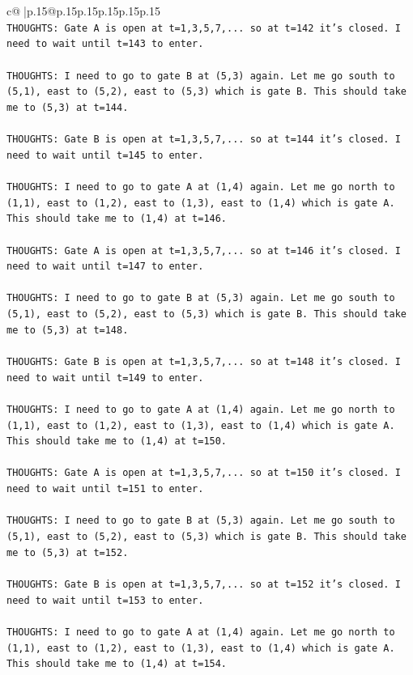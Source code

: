 \documentclass{article}
\begin{document}
{\begin{supertabular}{c@{$\;$}|p{.15\linewidth}@{}p{.15\linewidth}p{.15\linewidth}p{.15\linewidth}p{.15\linewidth}p{.15\linewidth}}
{{{\\ 
\texttt{THOUGHTS: Gate A is open at t=1,3,5,7,... so at t=142 it's closed. I need to wait until t=143 to enter.} \\
\\ 
\texttt{THOUGHTS: I need to go to gate B at (5,3) again. Let me go south to (5,1), east to (5,2), east to (5,3) which is gate B. This should take me to (5,3) at t=144.} \\
\\ 
\texttt{THOUGHTS: Gate B is open at t=1,3,5,7,... so at t=144 it's closed. I need to wait until t=145 to enter.} \\
\\ 
\texttt{THOUGHTS: I need to go to gate A at (1,4) again. Let me go north to (1,1), east to (1,2), east to (1,3), east to (1,4) which is gate A. This should take me to (1,4) at t=146.} \\
\\ 
\texttt{THOUGHTS: Gate A is open at t=1,3,5,7,... so at t=146 it's closed. I need to wait until t=147 to enter.} \\
\\ 
\texttt{THOUGHTS: I need to go to gate B at (5,3) again. Let me go south to (5,1), east to (5,2), east to (5,3) which is gate B. This should take me to (5,3) at t=148.} \\
\\ 
\texttt{THOUGHTS: Gate B is open at t=1,3,5,7,... so at t=148 it's closed. I need to wait until t=149 to enter.} \\
\\ 
\texttt{THOUGHTS: I need to go to gate A at (1,4) again. Let me go north to (1,1), east to (1,2), east to (1,3), east to (1,4) which is gate A. This should take me to (1,4) at t=150.} \\
\\ 
\texttt{THOUGHTS: Gate A is open at t=1,3,5,7,... so at t=150 it's closed. I need to wait until t=151 to enter.} \\
\\ 
\texttt{THOUGHTS: I need to go to gate B at (5,3) again. Let me go south to (5,1), east to (5,2), east to (5,3) which is gate B. This should take me to (5,3) at t=152.} \\
\\ 
\texttt{THOUGHTS: Gate B is open at t=1,3,5,7,... so at t=152 it's closed. I need to wait until t=153 to enter.} \\
\\ 
\texttt{THOUGHTS: I need to go to gate A at (1,4) again. Let me go north to (1,1), east to (1,2), east to (1,3), east to (1,4) which is gate A. This should take me to (1,4) at t=154.} \\
}}}
\end{supertabular}}
\end{document}
